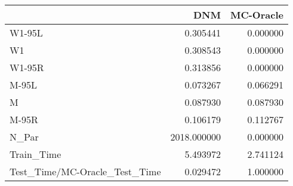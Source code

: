 \begin{tabular}{lrr}
\toprule
{} &          DNM &  MC-Oracle \\
\midrule
W1-95L                        &     0.305441 &   0.000000 \\
W1                            &     0.308543 &   0.000000 \\
W1-95R                        &     0.313856 &   0.000000 \\
M-95L                         &     0.073267 &   0.066291 \\
M                             &     0.087930 &   0.087930 \\
M-95R                         &     0.106179 &   0.112767 \\
N\_Par                         &  2018.000000 &   0.000000 \\
Train\_Time                    &     5.493972 &   2.741124 \\
Test\_Time/MC-Oracle\_Test\_Time &     0.029472 &   1.000000 \\
\bottomrule
\end{tabular}
